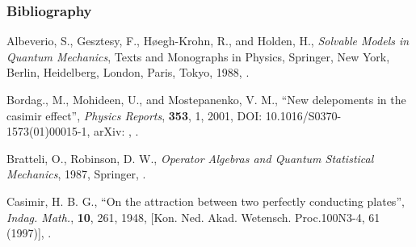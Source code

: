 \documentclass[10pt,t]{beamer}
\begin{document}
\begin{frame}
  \frametitle{Bibliography}


  \begin{thebibliography}{99}

   Albeverio, S.,
    Gesztesy, F., H{\o}egh-Krohn, R., and Holden, H., \emph{Solvable
      Models in Quantum Mechanics}, Texts and Monographs in Physics,
    Springer, New York, Berlin, Heidelberg, London, Paris, Tokyo,
    1988, \cite{AlbeverioEtAlSolvableModelsInQuantumMechanics1988}.

    Bordag., M., Mohideen, U., and Mostepanenko, V. M., ``New
    delepoments in the casimir effect'', \emph{Physics Reports},
    \textbf{353}, 1, 2001, DOI: 10.1016/S0370-1573(01)00015-1, arXiv:
    ,
    \cite{BordagMohideenMostepanenkoNewDevelopmentsCasimirEffect2001}.

   Bratteli, O.,
    Robinson, D. W., \emph{Operator Algebras and Quantum Statistical
      Mechanics}, 1987, Springer,
    \cite{BratteliRobinsonOperatorAlgebras1987}.


   Casimir, H. B. G., ``On
    the attraction between two perfectly conducting plates'',
    \emph{Indag. Math.}, \textbf{10}, 261, 1948, [Kon. Ned. Akad.
    Wetensch. Proc.100N3-4, 61 (1997)],
    \cite{CasimirOnTheAttractionBetween1948}.

  \end{thebibliography}

\end{frame}
\end{document}
